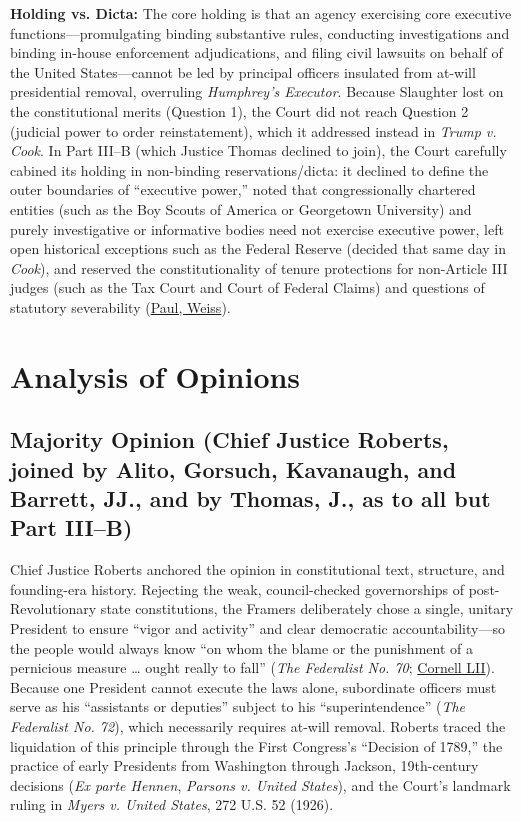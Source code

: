 \documentclass[12pt]{article}
\begin{document}
\textbf{Holding vs. Dicta:} The core holding is that an agency exercising core executive functions---promulgating binding substantive rules, conducting investigations and binding in-house enforcement adjudications, and filing civil lawsuits on behalf of the United States---cannot be led by principal officers insulated from at-will presidential removal, overruling \textit{Humphrey's Executor}. Because Slaughter lost on the constitutional merits (Question 1), the Court did not reach Question 2 (judicial power to order reinstatement), which it addressed instead in \textit{Trump v. Cook}. In Part III--B (which Justice Thomas declined to join), the Court carefully cabined its holding in non-binding reservations/dicta: it declined to define the outer boundaries of ``executive power,'' noted that congressionally chartered entities (such as the Boy Scouts of America or Georgetown University) and purely investigative or informative bodies need not exercise executive power, left open historical exceptions such as the Federal Reserve (decided that same day in \textit{Cook}), and reserved the constitutionality of tenure protections for non-Article III judges (such as the Tax Court and Court of Federal Claims) and questions of statutory severability (\href{https://www.paulweiss.com/insights/client-memos/supreme-court-overrules-humphrey-s-executor-but-preserves-the-fed-s-independence}{Paul, Weiss}).

\section{Analysis of Opinions}

\subsection{Majority Opinion (Chief Justice Roberts, joined by Alito, Gorsuch, Kavanaugh, and Barrett, JJ., and by Thomas, J., as to all but Part III--B)}

Chief Justice Roberts anchored the opinion in constitutional text, structure, and founding-era history. Rejecting the weak, council-checked governorships of post-Revolutionary state constitutions, the Framers deliberately chose a single, unitary President to ensure ``vigor and activity'' and clear democratic accountability---so the people would always know ``on whom the blame or the punishment of a pernicious measure \ldots{} ought really to fall'' (\textit{The Federalist No. 70}; \href{https://www.law.cornell.edu/supremecourt/text/25-332}{Cornell LII}). Because one President cannot execute the laws alone, subordinate officers must serve as his ``assistants or deputies'' subject to his ``superintendence'' (\textit{The Federalist No. 72}), which necessarily requires at-will removal. Roberts traced the liquidation of this principle through the First Congress's ``Decision of 1789,'' the practice of early Presidents from Washington through Jackson, 19th-century decisions (\textit{Ex parte Hennen}, \textit{Parsons v. United States}), and the Court's landmark ruling in \textit{Myers v. United States}, 272 U.S. 52 (1926).
\end{document}
